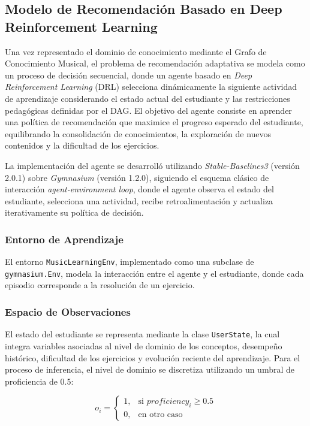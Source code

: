 \documentclass[conference]{IEEEtran}
\begin{document}
\subsection{Modelo de Recomendación Basado en Deep Reinforcement Learning}

Una vez representado el dominio de conocimiento mediante el Grafo de Conocimiento Musical, el problema de recomendación adaptativa se modela como un proceso de decisión secuencial, donde un agente basado en \textit{Deep Reinforcement Learning} (DRL) selecciona dinámicamente la siguiente actividad de aprendizaje considerando el estado actual del estudiante y las restricciones pedagógicas definidas por el DAG. El objetivo del agente consiste en aprender una política de recomendación que maximice el progreso esperado del estudiante, equilibrando la consolidación de conocimientos, la exploración de nuevos contenidos y la dificultad de los ejercicios.

La implementación del agente se desarrolló utilizando \textit{Stable-Baselines3} (versión 2.0.1) sobre \textit{Gymnasium} (versión 1.2.0), siguiendo el esquema clásico de interacción \textit{agent-environment loop}, donde el agente observa el estado del estudiante, selecciona una actividad, recibe retroalimentación y actualiza iterativamente su política de decisión.

\subsubsection{Entorno de Aprendizaje}

El entorno \texttt{MusicLearningEnv}, implementado como una subclase de \texttt{gymnasium.Env}, modela la interacción entre el agente y el estudiante, donde cada episodio corresponde a la resolución de un ejercicio.

\subsubsection{Espacio de Observaciones}

El estado del estudiante se representa mediante la clase \texttt{UserState}, la cual integra variables asociadas al nivel de dominio de los conceptos, desempeño histórico, dificultad de los ejercicios y evolución reciente del aprendizaje. Para el proceso de inferencia, el nivel de dominio se discretiza utilizando un umbral de proficiencia de 0.5:

\begin{equation}
o_i=
\begin{cases}
1, & \text{si } proficiency_i \ge 0.5\\
0, & \text{en otro caso}
\end{cases}
\end{equation}
\end{document}
